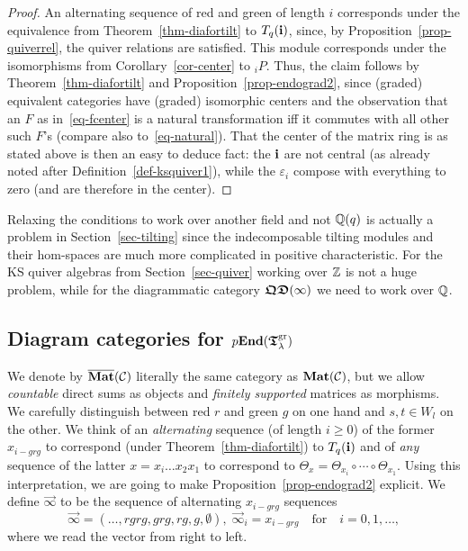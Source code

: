 \begin{proof}
An alternating sequence of red and green of 
length $i$ corresponds under the equivalence 
from Theorem~\ref{thm-diafortilt} to $T_q({\boldsymbol{\mathrm{i}}})$, 
since, by Proposition~\ref{prop-quiverrel}, the 
quiver relations are satisfied. This module 
corresponds under the isomorphisms from 
Corollary~\ref{cor-center} to ${}_iP$. Thus, the 
claim follows by Theorem~\ref{thm-diafortilt} and 
Proposition~\ref{prop-endograd2}, since (graded) 
equivalent categories have (graded) isomorphic 
centers and the observation that an $F$ as 
in~\eqref{eq-fcenter} is a natural transformation 
iff it commutes with all other such $F$'s 
(compare also to~\eqref{eq-natural}). That 
the center of the matrix ring is as stated 
above is then an easy to deduce fact: the 
$\boldsymbol{\mathrm{i}}$ are not central (as already noted 
after Definition~\ref{def-ksquiver1}), while 
the $\varepsilon_i$ compose with everything to zero 
(and are therefore in the center).
\end{proof}




\begin{rem}\label{rem-overfinitefields}
Relaxing the conditions 
to work over another field and not $\mathbb{Q}(q)$ is actually a 
problem in Section~\ref{sec-tilting} since the 
indecomposable tilting modules and their hom-spaces 
are much more complicated in positive characteristic. 
For the KS quiver algebras from Section~\ref{sec-quiver} working over 
$\mathbb{Z}$ is not a huge problem, while for the diagrammatic category 
$\boldsymbol{\mathfrak{QD}}(\infty)$ we need to work over $\mathbb{Q}$.
\end{rem}




\subsection{Diagram categories for \texorpdfstring{$p\boldsymbol{\mathrm{End}}(\boldsymbol{\mathfrak{T}}_{\lambda}^{\mathrm{gr}})$}{Endo(Tgrl)}}\label{sub-projdia}



We denote by $\overline{\boldsymbol{\mathrm{Mat}}}(\mathcal C)$ 
literally the same category as $\boldsymbol{\mathrm{Mat}}(\mathcal C)$, 
but we allow \textit{countable} direct sums as 
objects and \textit{finitely supported} matrices as morphisms.
We carefully distinguish between 
red $r$ and green $g$ on one hand 
and $s,t\in W_l$ on the other. We 
think of an \textit{alternating} 
sequence (of length $i\geq 0$) of the 
former $x_{i-grg}$ to correspond (under 
Theorem~\ref{thm-diafortilt}) to $T_q({\boldsymbol{\mathrm{i}}})$ and 
of \textit{any} sequence of the latter $x=x_i\dots x_2x_1$ 
to correspond to $\Theta_x=\Theta_{x_i}\circ\cdots\circ\Theta_{x_1}$. 
Using this interpretation, we are going to make 
Proposition~\ref{prop-endograd2} explicit.
We define $\vec{\infty}$ to be the sequence of alternating $x_{i-grg}$ sequences
\[
\vec{\infty}=(\dots,rgrg,grg,rg,g,\emptyset),\;\vec{\infty}_i=x_{i-grg}\quad\text{for}\quad i=0,1,\dots,
\]
where we read the vector from right to left.





